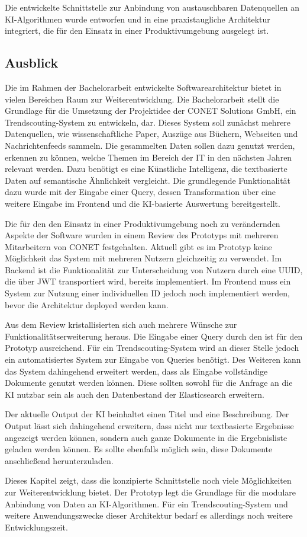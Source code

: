 Die entwickelte Schnittstelle zur Anbindung von austauschbaren Datenquellen an KI-Algorithmen wurde entworfen und in eine praxistaugliche Architektur integriert, die für den Einsatz in einer Produktivumgebung ausgelegt ist. 

\subsection{Ausblick}
Die im Rahmen der Bachelorarbeit entwickelte Softwarearchitektur bietet in vielen Bereichen Raum zur Weiterentwicklung. Die Bachelorarbeit stellt die Grundlage für die Umsetzung der Projektidee der CONET Solutions GmbH, ein Trendscouting-System zu entwickeln, dar. Dieses System soll zunächst mehrere Datenquellen, wie wissenschaftliche Paper, Auszüge aus Büchern, Webseiten und Nachrichtenfeeds sammeln. Die gesammelten Daten sollen dazu genutzt werden, erkennen zu können, welche Themen im Bereich der IT in den nächsten Jahren relevant werden. Dazu benötigt es eine Künstliche Intelligenz, die textbasierte Daten auf semantische Ähnlichkeit vergleicht. Die grundlegende Funktionalität dazu wurde mit der Eingabe einer Query, dessen Transformation über eine weitere Eingabe im Frontend und die KI-basierte Auswertung bereitgestellt.

Die für den den Einsatz in einer Produktivumgebung noch zu verändernden Aspekte der Software wurden in einem Review des Prototyps mit mehreren Mitarbeitern von CONET festgehalten. Aktuell gibt es im Prototyp keine Möglichkeit das System mit mehreren Nutzern gleichzeitig zu verwendet. Im Backend ist die Funktionalität zur Unterscheidung von Nutzern durch eine UUID, die über JWT transportiert wird, bereits implementiert. Im Frontend muss ein System zur Nutzung einer individuellen ID jedoch noch implementiert werden, bevor die Architektur deployed werden kann.  

Aus dem Review kristallisierten sich auch mehrere Wünsche zur Funktionalitätserweiterung heraus. Die Eingabe einer Query durch den ist für den Prototyp ausreichend. Für ein Trendscouting-System wird an dieser Stelle jedoch ein automatisiertes System zur Eingabe von Queries benötigt. Des Weiteren kann das System dahingehend erweitert werden, dass als Eingabe vollständige Dokumente genutzt werden können. Diese sollten sowohl für die Anfrage an die KI nutzbar sein als auch den Datenbestand der Elasticsearch erweitern. 

Der aktuelle Output der KI beinhaltet einen Titel und eine Beschreibung. Der Output lässt sich dahingehend erweitern, dass nicht nur textbasierte Ergebnisse angezeigt werden können, sondern auch ganze Dokumente in die Ergebnisliste geladen werden können. Es sollte ebenfalls möglich sein, diese Dokumente anschließend herunterzuladen.

Dieses Kapitel zeigt, dass die konzipierte Schnittstelle noch viele Möglichkeiten zur Weiterentwicklung bietet. Der Prototyp legt die Grundlage für die modulare Anbindung von Daten an KI-Algorithmen. Für ein Trendscouting-System und weitere Anwendungszwecke dieser Architektur bedarf es allerdings noch weitere Entwicklungszeit.
